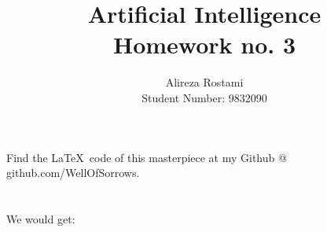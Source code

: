 \documentclass{article}
\title{Artificial Intelligence\\Homework no. 3}
\author{Alireza Rostami\\Student Number: 9832090}
\date{}
\begin{document}
    \maketitle
    \begin{center}
        Find the \LaTeX \ code of this masterpiece at my Github @ github.com/WellOfSorrows.
    \end{center}
   \section{}
   \subsection{}
   \subsubsection{}
   We would get:
\end{document}
